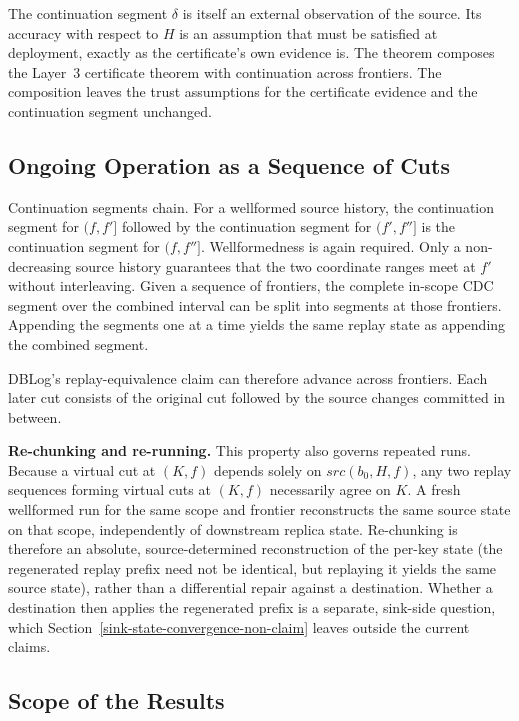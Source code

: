 \documentclass[letterpaper,10pt,twocolumn]{article}
\newcommand{\Src}{\mathit{src}}
\begin{document}
The continuation segment $\delta$ is itself an external observation of
the source. Its accuracy with respect to $H$ is an assumption that
must be satisfied at deployment, exactly as the certificate's own
evidence is. The theorem composes the Layer~3 certificate theorem with
continuation across frontiers. The composition leaves the trust
assumptions for the certificate evidence and the continuation segment
unchanged.

\subsection{Ongoing Operation as a Sequence of
Cuts}\label{ongoing-operation-as-a-sequence-of-cuts}

Continuation segments chain. For a wellformed source history, the
continuation segment for $(f,f']$ followed by the continuation segment
for $(f',f'']$ is the continuation segment for $(f,f'']$. Wellformedness
is again required. Only a non-decreasing source history guarantees that
the two coordinate ranges meet at $f'$ without interleaving. Given a
sequence of frontiers, the complete in-scope CDC segment over the combined
interval can be split into segments at those frontiers. Appending the
segments one at a time yields the same replay state as appending the
combined segment.

DBLog's replay-equivalence claim can therefore advance across frontiers.
Each later cut consists of the original cut followed by the source
changes committed in between.

\smallskip
\noindent\textbf{Re-chunking and re-running.} This property also governs
repeated runs. Because a virtual cut at $(K,f)$ depends solely on
$\Src(b_0,H,f)$, any two replay sequences forming virtual cuts at $(K,f)$
necessarily agree on $K$. A fresh wellformed run for the same scope and
frontier reconstructs the same source state on that scope, independently
of downstream replica state.
Re-chunking is therefore an absolute, source-determined reconstruction of
the per-key state (the regenerated replay prefix need not be identical,
but replaying it yields the same source state), rather than a differential
repair against a destination.
Whether a destination then applies the regenerated prefix is a
separate, sink-side question, which
Section~\ref{sink-state-convergence-non-claim} leaves outside the
current claims.

\subsection{Scope of the Results}\label{continuation-boundaries}
\end{document}
